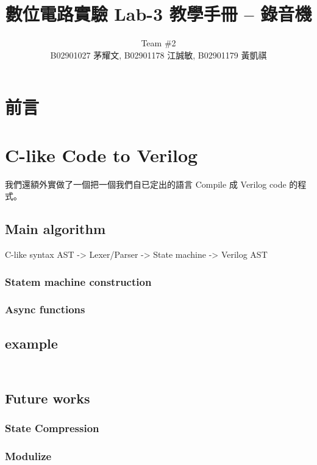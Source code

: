 \documentclass[12pt, a4paper]{article}
\title{數位電路實驗 Lab-3 教學手冊 -- 錄音機 \vspace{-0.2cm}}
\author{Team \#2 \\ B02901027 茅耀文, B02901178 江誠敏, B02901179 黃凱祺}
\begin{document}
\maketitle

\setcounter{section}{-1}
\section{前言}

\section{C-like Code to Verilog}
我們還額外實做了一個把一個我們自已定出的語言 Compile 成 Verilog code
的程式。

\subsection{Main algorithm}
C-like syntax AST -> Lexer/Parser -> State machine -> Verilog AST

\subsubsection{Statem machine construction}

\subsubsection{Async functions}

\subsection{example}
\inputminted{ver}{ref-codes/f.ver}

\inputminted{ver}{ref-codes/g.ver}

\subsection{Future works}
\subsubsection{State Compression}

\subsubsection{Modulize}
\end{document}
